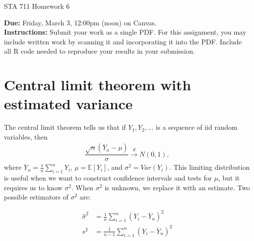 \documentclass[11pt]{article}
\begin{document}
\begin{center}
\Large
STA 711 Homework 6\\
\normalsize
\vspace{5mm}
\end{center}

\noindent \textbf{Due:} Friday, March 3, 12:00pm (noon) on Canvas.\\ 

\noindent \textbf{Instructions:} Submit your work as a single PDF. For this assignment, you may include written work by scanning it and incorporating it into the PDF. Include all R code needed to reproduce your results in your submission.



\section*{Central limit theorem with estimated variance}

The central limit theorem tells us that if $Y_1, Y_2,...$ is a sequence of iid random variables, then
\begin{align*}
\dfrac{\sqrt{n}(\overline{Y}_n - \mu)}{\sigma} \overset{d}{\to} N(0, 1),
\end{align*}
where $\overline{Y}_n = \frac{1}{n} \sum \limits_{i=1}^n Y_i$, $\mu = \mathbb{E}[Y_i]$, and $\sigma^2 = Var(Y_i)$. This limiting distribution is useful when we want to construct confidence intervals and tests for $\mu$, but it requires us to know $\sigma^2$. When $\sigma^2$ is unknown, we replace it with an estimate. Two possible estimators of $\sigma^2$ are:

\begin{align*}
\widehat{\sigma}^2 &= \frac{1}{n} \sum \limits_{i=1}^n (Y_i - \overline{Y}_n)^2 \\
s^2 &= \frac{1}{n-1} \sum \limits_{i=1}^n (Y_i - \overline{Y}_n)^2
\end{align*}
\end{document}

